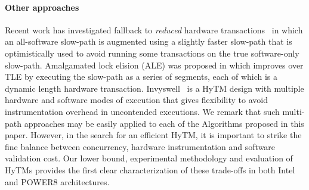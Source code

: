 \paragraph{Other approaches}
Recent work has investigated fallback to \emph{reduced} hardware transactions~\cite{MS13}
in which an all-software slow-path is augmented using a slightly faster slow-path 
that is optimistically used to avoid running some transactions on the true software-only slow-path.
Amalgamated lock elision (ALE) was proposed in \cite{ale15} which improves over TLE
by executing the slow-path as a series of segments, each of which is a dynamic length hardware transaction.
Invyswell~\cite{Calciu14} is a HyTM design with multiple hardware and software modes of execution that gives flexibility to avoid instrumentation overhead in uncontended executions.
We remark that such multi-path approaches may be easily applied to each of the Algorithms proposed in this paper. However, 
in the search for an efficient HyTM, it is important to strike the fine balance between concurrency, hardware instrumentation and software validation cost.
Our lower bound, experimental methodology and evaluation of HyTMs provides the first clear characterization of these trade-offs in both Intel and POWER8 architectures. 
%